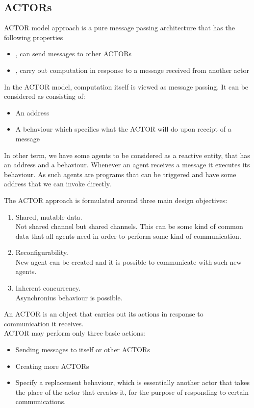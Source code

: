 \subsection{ACTORs}
ACTOR model approach is a pure message passing architecture that has the following properties
\begin{itemize}
\item {}, can send messages to other ACTORs
\item {}, carry out computation in response to a message received from another actor
\end{itemize}
In the ACTOR model, computation itself is viewed as message passing.
It can be considered as consisting of:
\begin{itemize}
\item An address
\item A behaviour which specifies what the ACTOR will do upon receipt of a message
\end{itemize}
In other term, we have some agents to be considered as a reactive entity, that has an address and a behaviour. Whenever an agent receives a message it executes its behaviour. As such agents are programs that can be triggered and have some address that we can invoke directly.

The ACTOR approach is formulated around three main design objectives:
\begin{enumerate}
\item Shared, mutable data. \\
Not shared channel but shared channels. This can be some kind of common data that all agents need in order to perform some kind of communication.
\item Reconfigurability.\\
New agent can be created and it is possible to communicate with such new agents.
\item Inherent concurrency.\\
Asynchronius behaviour is possible.
\end{enumerate}

An ACTOR is an object that carries out its actions in response to communication it receives.\\
ACTOR may perform only three basic actions:
\begin{itemize}
\item Sending messages to itself or other ACTORs
\item Creating more ACTORs
\item Specify a replacement behaviour, which is essentially another actor that takes the place of the actor that creates it, for the purpose of responding to certain communications.
\end{itemize}

